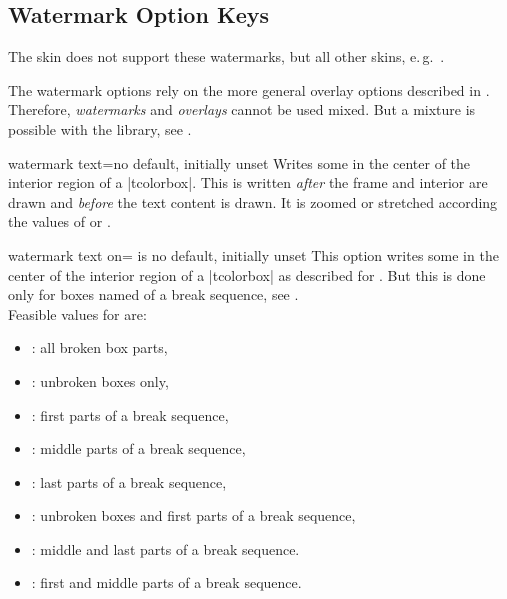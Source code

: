 \clearpage
\subsection{Watermark Option Keys}\label{subsec:watermarks}
The skin  does not support these watermarks,
but all other skins, e.\,g.\ .

\begin{marker}
The watermark options rely on the more general overlay options described in
.
Therefore, \emph{watermarks} and \emph{overlays} cannot be used mixed.
But a mixture is possible with the  library, see .
\end{marker}


\begin{docTcbKey}{watermark text}{=}{no default, initially unset}
  Writes some  in the center of the interior region of a |tcolorbox|.
  This  is written \emph{after} the
  frame and interior are drawn and \emph{before} the text content is drawn.
  It is zoomed or stretched according the values of
   or .
\begin{dispExample}

\begin{tcolorbox}[enhanced,title=My title,watermark text=My Watermark]
\lipsum[1]
\tcblower
\lipsum[2]
\end{tcolorbox}
\end{dispExample}
\end{docTcbKey}

\enlargethispage*{1cm}

\begin{docTcbKey}{watermark text on}{= is }{no default, initially unset}
  This option writes some  in the center of the interior region of a |tcolorbox|
  as described for .
  But this is done only for boxes named  of a break sequence, see
  .\\ 
  Feasible values for  are:
  \begin{itemize}
  \item{}: all broken box parts,
  \item{}: unbroken boxes only,
  \item{}: first parts of a break sequence,
  \item{}: middle parts of a break sequence,
  \item{}: last parts of a break sequence,
  \item{}: unbroken boxes and first parts of a break sequence,
  \item{}: middle and last parts of a break sequence.
  \item{}: first and middle parts of a break sequence.
  \end{itemize}
\end{docTcbKey}


